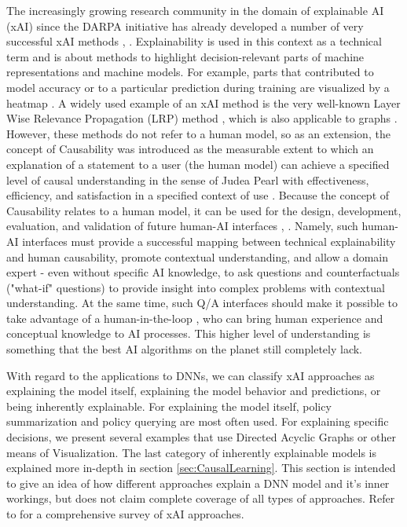 \documentclass[twoside,11pt]{article}
\begin{document}
The increasingly growing research community in the domain of explainable AI (xAI) since the DARPA \cite{GunningAha:2019:DARPA} initiative has already developed a number of very successful xAI methods \cite{ZhouEtAl:2021:QualitySurvey}, \cite{HolzWoj:2022:XAIOverview}. Explainability is used in this context as a technical term and is about methods to highlight decision-relevant parts of machine representations and machine models. For example, parts that contributed to model accuracy or to a particular prediction during training are visualized by a heatmap \cite{SturmEtAl:2015:InteractiveHeatmap}. A widely used example of an xAI method is the very well-known Layer Wise Relevance Propagation (LRP) method \cite{LapuschkinEtAl:2016:LRP}, which is also applicable to graphs \cite{SchnakeMontavon:2020:XAIgraphs}. However, these methods do not refer to a human model, so as an extension, the concept of Causability \cite{HolzingerEtAl:2019:Wiley-Paper} was introduced as the measurable extent to which an explanation of a statement to a user (the human model) can achieve a specified level of causal understanding in the sense of Judea Pearl \cite{Pearl:2009:Causality} with effectiveness, efficiency, and satisfaction in a specified context of use \cite{HolzingerEtAl:2020:QualityOfExplanations}. Because the concept of Causability relates to a human model, it can be used for the design, development, evaluation, and validation of future human-AI interfaces \cite{HolzingerMueller:2021:HumanAI}, \cite{HolzingerMueller:2022:PersonasAI}. Namely, such human-AI interfaces must provide a successful mapping between technical explainability and human causability, promote contextual understanding, and allow a domain expert - even without specific AI knowledge, to ask questions and counterfactuals ("what-if" questions) \cite{HolzingerEtAl:2021:MultiModalCausabilityGNN} to provide insight into complex problems with contextual understanding. At the same time, such Q/A interfaces should make it possible to take advantage of a human-in-the-loop \cite{Holzinger:2016:iML}, \cite{Holzinger:2019:HumanLoopAPIN} who can bring human experience and conceptual knowledge to AI processes. This higher level of understanding is something that the best AI algorithms on the planet still completely lack. 

With regard to the applications to DNNs, we can classify xAI approaches as explaining the model itself, explaining the model behavior and predictions, or being inherently explainable. For explaining the model itself, policy summarization and policy querying are most often used. For explaining specific decisions, we present several examples that use Directed Acyclic Graphs or other means of Visualization. The last category of inherently explainable models is explained more in-depth in section \ref{sec:CausalLearning}. This section is intended to give an idea of how different approaches explain a DNN model and it's inner workings, but does not claim complete coverage of all types of approaches. Refer to \cite{GlanoisEtAl:2021:SurveyInterpretableRL} for a comprehensive survey of xAI approaches.
\end{document}
